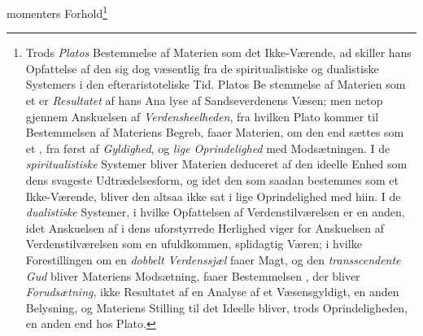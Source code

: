 momenters Forhold\footnote{Trods \emph{Platos} Bestemmelse af Materien som det Ikke-Værende, ad\-%
skiller hans Opfattelse af den sig dog væsentlig fra de spiritualistiske
og dualistiske Systemers i den efteraristoteliske Tid. Platos Be\-%
stemmelse af Materien som et  er \emph{Resultatet} af hans Ana\-%
lyse af Sandseverdenens Væsen; men netop gjennem Anskuelsen af
\emph{Verdensheelheden}, fra hvilken Plato kommer til Bestemmelsen
af Materiens Begreb, faaer Materien, om den end sættes som et
, fra først af \emph{Gyldighed}, og \emph{lige Oprindelighed} med
Modsætningen. I de \emph{spiritualistiske} Systemer bliver Materien
deduceret af den ideelle Enhed som dens svageste Udtrædelsesform,
og idet den som saadan bestemmes som et Ikke-Værende, bliver den
altsaa ikke sat i lige Oprindelighed med hiin. I de \emph{dualistiske}
Systemer, i hvilke Opfattelsen af Verdenstilværelsen er en anden,
idet Anskuelsen af  i dens uforstyrrede Herlighed viger for
Anskuelsen af Verdenstilværelsen som en ufuldkommen, splidagtig
Væren; i hvilke Forestillingen om en \emph{dobbelt Verdenssjæl} faaer
Magt, og den \emph{transscendente Gud} bliver Materiens Modsætning,
faaer Bestemmelsen , der bliver \emph{Forudsætning}, ikke
Resultatet af en Analyse af et Væsensgyldigt, en anden Belysning, og
Materiens Stilling til det Ideelle bliver, trods Oprindeligheden, en
anden end hos Plato.}
